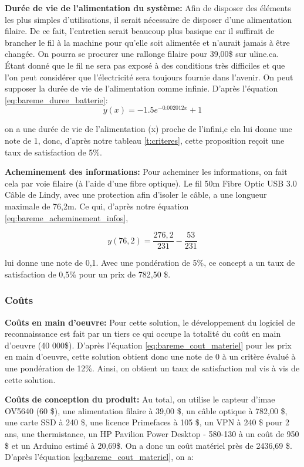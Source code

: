 \textbf{Durée de vie de l'alimentation du système:} Afin de disposer des éléments les plus simples d'utilisations, il serait nécessaire de disposer d'une alimentation filaire. De ce fait, l'entretien serait beaucoup plus basique car il suffirait de brancher le fil à la machine pour qu'elle soit alimentée et n'aurait jamais à être changée. On pourra se procurer une rallonge filaire pour 39,00\$ sur uline.ca. Étant donné que le fil ne sera pas exposé à des conditions très difficiles et que l'on peut considérer que l'électricité sera toujours fournie dans l'avenir. On peut supposer la durée de vie de l'alimentation comme infinie.
D'après l'équation \ref{eq:bareme_duree_batterie}:
\begin{equation}
    y(x) = -1.5e^{-0.002012x} + 1 
        \end{equation}

on a une durée de vie de l'alimentation (x) proche de l'infini,c ela lui donne une note de 1, donc, d'après notre tableau \ref{t:criteres}, cette proposition reçoit une taux de satisfaction de 5\%.

\textbf{Acheminement des informations:}
Pour acheminer les informations, on fait cela par voie filaire (à l'aide d'une fibre optique). Le fil 50m Fibre Optic USB 3.0 Câble de Lindy, avec une protection afin d'isoler le câble, a une longueur maximale de 76,2m. Ce qui, d'après notre équation \ref{eq:bareme_acheminement_infos},

\begin{equation}
    y(76,2) = 
        \frac{276,2}{231} - \frac{53}{231}
\end{equation}

lui donne une note de 0,1. Avec une pondération de 5\%, ce concept a un taux de satisfaction de 0,5\% pour un prix de 782,50 \$.

\subsubsection{Coûts}
\textbf{Coûts en main d'oeuvre:}
Pour cette solution, le développement du logiciel de reconnaissance est fait par un tiers ce qui occupe la totalité du coût en main d'oeuvre (40 000\$). D'après l'équation \ref{eq:bareme_cout_materiel} pour les prix en main d'oeuvre, cette solution obtient donc une note de 0 à un critère évalué à une pondération de 12\%. Ainsi, on obtient un taux de satisfaction nul vis à vis de cette solution.

\textbf{Coûts de conception du produit:}
Au total, on utilise le capteur d'imae OV5640 (60 \$), une alimentation filaire à 39,00 \$, un câble optique à 782,00 \$, une carte SSD à 240 \$, une licence Primefaces à 105 \$, un VPN à 240 \$ pour 2 ans, une thermistance, un HP Pavilion Power Desktop - 580-130 à un coût de 950 \$ et un Arduino estimé à 20,69\$. On a donc un coût matériel près de 2436,69 \$. D'après l'équation \ref{eq:bareme_cout_materiel}, on a:

